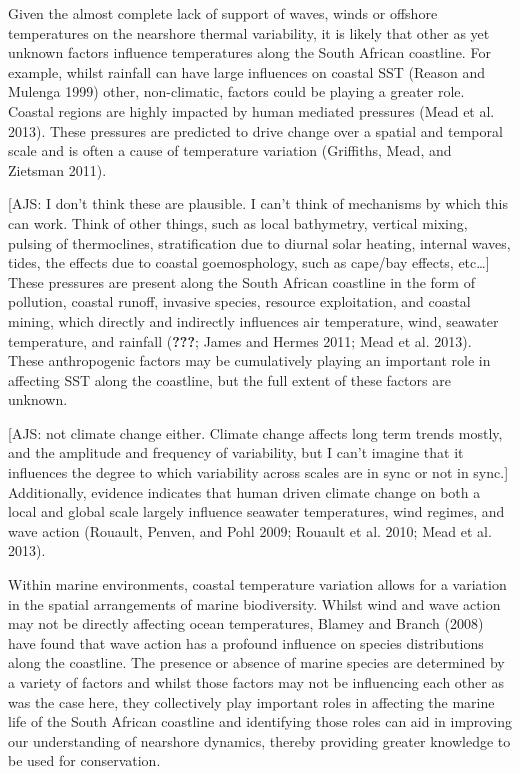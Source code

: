 \documentclass[12pt,a4paper,]{article}
\begin{document}
Given the almost complete lack of support of waves, winds or offshore
temperatures on the nearshore thermal variability, it is likely that
other as yet unknown factors influence temperatures along the South
African coastline. For example, whilst rainfall can have large
influences on coastal SST (Reason and Mulenga 1999) other, non-climatic,
factors could be playing a greater role. Coastal regions are highly
impacted by human mediated pressures (Mead et al. 2013). These pressures
are predicted to drive change over a spatial and temporal scale and is
often a cause of temperature variation (Griffiths, Mead, and Zietsman
2011).

{[}AJS: I don't think these are plausible. I can't think of mechanisms
by which this can work. Think of other things, such as local bathymetry,
vertical mixing, pulsing of thermoclines, stratification due to diurnal
solar heating, internal waves, tides, the effects due to coastal
goemosphology, such as cape/bay effects, etc\ldots{}{]} These pressures
are present along the South African coastline in the form of pollution,
coastal runoff, invasive species, resource exploitation, and coastal
mining, which directly and indirectly influences air temperature, wind,
seawater temperature, and rainfall ({\textbf{???}}; James and Hermes
2011; Mead et al. 2013). These anthropogenic factors may be cumulatively
playing an important role in affecting SST along the coastline, but the
full extent of these factors are unknown.

{[}AJS: not climate change either. Climate change affects long term
trends mostly, and the amplitude and frequency of variability, but I
can't imagine that it influences the degree to which variability across
scales are in sync or not in sync.{]} Additionally, evidence indicates
that human driven climate change on both a local and global scale
largely influence seawater temperatures, wind regimes, and wave action
(Rouault, Penven, and Pohl 2009; Rouault et al. 2010; Mead et al. 2013).

Within marine environments, coastal temperature variation allows for a
variation in the spatial arrangements of marine biodiversity. Whilst
wind and wave action may not be directly affecting ocean temperatures,
Blamey and Branch (2008) have found that wave action has a profound
influence on species distributions along the coastline. The presence or
absence of marine species are determined by a variety of factors and
whilst those factors may not be influencing each other as was the case
here, they collectively play important roles in affecting the marine
life of the South African coastline and identifying those roles can aid
in improving our understanding of nearshore dynamics, thereby providing
greater knowledge to be used for conservation.
\end{document}
